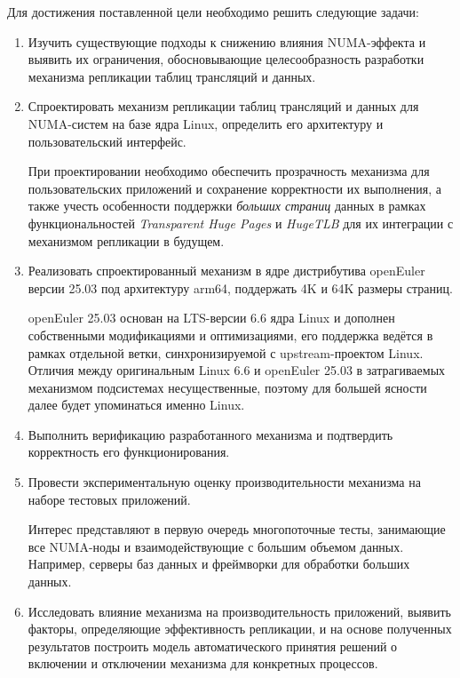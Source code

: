 Для достижения поставленной цели необходимо решить следующие задачи:
\begin{enumerate}
    \item Изучить существующие подходы к снижению влияния NUMA-эффекта и выявить их ограничения, обосновывающие целесообразность разработки механизма репликации таблиц трансляций и данных.
    \item Спроектировать механизм репликации таблиц трансляций и данных для NUMA-систем на базе ядра Linux, определить его архитектуру и пользовательский интерфейс.

    При проектировании необходимо обеспечить прозрачность механизма для пользовательских приложений и сохранение корректности их выполнения, а также учесть особенности поддержки \textit{больших страниц} данных в рамках функциональностей \textit{Transparent Huge Pages}\cite{THP} и \textit{HugeTLB}\cite{hugetlb} для их интеграции с механизмом репликации в будущем.

    \item Реализовать спроектированный механизм в ядре дистрибутива openEuler версии 25.03\cite{openEuler} под архитектуру arm64, поддержать 4K и 64K размеры страниц. 

    openEuler 25.03 основан на LTS-версии 6.6 ядра Linux и дополнен собственными модификациями и оптимизациями, его поддержка ведётся в рамках отдельной ветки, синхронизируемой с upstream-проектом Linux. Отличия между оригинальным Linux 6.6 и openEuler 25.03 в затрагиваемых механизмом подсистемах несущественные, поэтому для большей ясности далее будет упоминаться именно Linux.

    \item Выполнить верификацию разработанного механизма и подтвердить корректность его функционирования.
    \item Провести экспериментальную оценку производительности механизма на наборе тестовых приложений.

    Интерес представляют в первую очередь многопоточные тесты, занимающие все NUMA-ноды и взаимодействующие с большим объемом данных. Например, серверы баз данных и фреймворки для обработки больших данных.

    \item Исследовать влияние механизма на производительность приложений, выявить факторы, определяющие эффективность репликации, и на основе полученных результатов построить модель автоматического принятия решений о включении и отключении механизма для конкретных процессов.
\end{enumerate}

